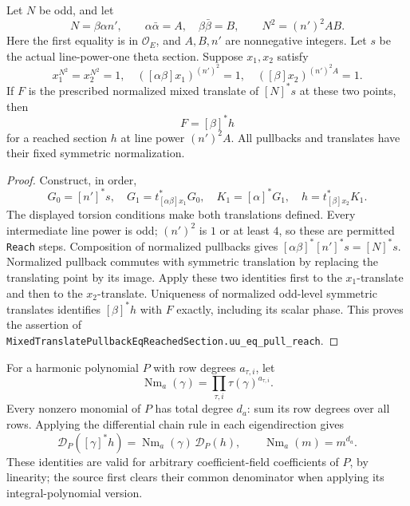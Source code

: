 \begin{srlemma}
\label{lem:ftb-mixed-pullback}
Let \(N\) be odd, and let
\[
 N=\beta\alpha n',\qquad
 \alpha\bar\alpha=A,\quad\beta\bar\beta=B,\qquad
                                N^2=(n')^2AB .
\]
Here the first equality is in \(\mathcal O_E\), and \(A,B,n'\) are
nonnegative integers.
Let \(s\) be the actual line-power-one theta section.
Suppose \(x_1,x_2\) satisfy
\[
 x_1^{N^2}=x_2^{N^2}=1,\quad
 ([\alpha\beta]x_1)^{(n')^2}=1,\quad
 ([\beta]x_2)^{(n')^2A}=1 .
\]
If \(F\) is the prescribed normalized mixed translate of
\([N]^*s\) at these two points, then
\[
                         F=[\beta]^*h
\]
for a reached section \(h\) at line power \((n')^2A\).
All pullbacks and translates have their fixed symmetric normalization.
\end{srlemma}
\begin{proof}
Construct, in order,
\[
 G_0=[n']^*s,\quad
 G_1=t_{[\alpha\beta]x_1}^*G_0,\quad
 K_1=[\alpha]^*G_1,\quad
 h=t_{[\beta]x_2}^*K_1 .
\]
The displayed torsion conditions make both translations defined.
Every intermediate line power is odd; \((n')^2\) is \(1\) or at
least \(4\), so these are permitted \texttt{Reach} steps.
Composition of normalized pullbacks gives
\([\alpha\beta]^*[n']^*s=[N]^*s\).
Normalized pullback commutes with symmetric translation by replacing
the translating point by its image.
Apply these two identities first to the \(x_1\)-translate and then
to the \(x_2\)-translate.
Uniqueness of normalized odd-level symmetric translates identifies
\([\beta]^*h\) with \(F\) exactly, including its scalar phase.
This proves the assertion of
\texttt{MixedTranslatePullbackEqReachedSection.uu\_eq\_pull\_reach}.
\end{proof}

For a harmonic polynomial \(P\) with row degrees \(a_{\tau,i}\),
let
\[
                 \operatorname{Nm}_a(\gamma)
                  =\prod_{\tau,i}\tau(\gamma)^{a_{\tau,i}} .
\]
Every nonzero monomial of \(P\) has total degree \(d_a\):
sum its row degrees over all rows.
Applying the differential chain rule in each eigendirection gives
\[
 \mathcal D_P([\gamma]^*h)
          =\operatorname{Nm}_a(\gamma)\,\mathcal D_P(h),\qquad
 \operatorname{Nm}_a(m)=m^{d_a}.
\]
These identities are valid for arbitrary coefficient-field
coefficients of \(P\), by linearity; the source first clears their
common denominator when applying its integral-polynomial version.

